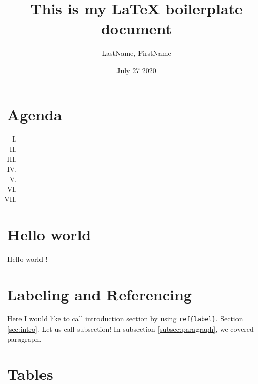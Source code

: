 \documentclass{article}
\begin{document}
\title{This is my \LaTeX{}  boilerplate document}
\author{LastName, FirstName}
\date{July 27 2020}
\def\titledescription{Description of the document}




\newpage
\tableofcontents
\newpage

\section{Agenda}

\begin{enumerate}[I.] %
	\item {}
	\item {}
	\item {}
	\item {}
	\item {}
	\item {}
	\item {}
\end{enumerate}



\section{Hello world}
\label{sec:hello}
Hello world !



\section{Labeling and Referencing}
\label{sec:labeling-and-referencing}

Here I would like to call introduction section by using \verb|ref{label}|. Section \ref{sec:intro}. Let us call subsection! In subsection \ref{subsec:paragraph}, we covered paragraph.



\newpage
\section{Tables}
\label{sec:tables}
\end{document}
